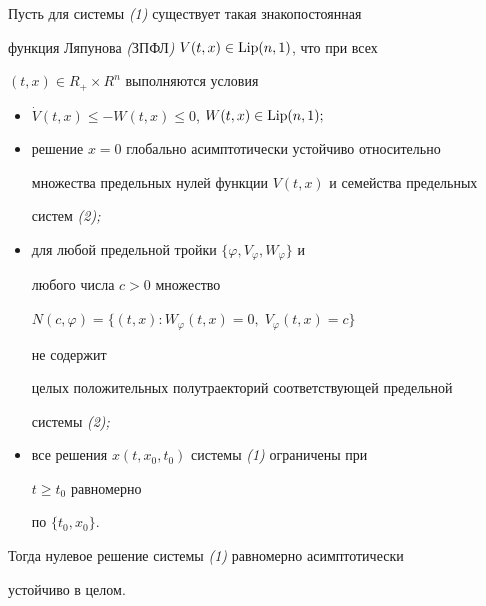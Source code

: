 \begin{thm} Пусть для системы {\em (1)} существует такая знакопостоянная 


функция Ляпунова {\em (}ЗПФЛ{\em )} $V(t,x)\in\operatorname{Lip}(n,1)$, что при всех 


$(t,x)\in R_+\times R^n$ выполняются условия 


\begin{itemize} 


\item[1.] $\Dot V(t,x)\le -W(t,x)\le 0$, $W(t,x)\in\operatorname{Lip}(n,1);$ 


 


\item [2.] решение $x=0$ глобально асимптотически устойчиво относительно 


множества предельных нулей функции $V(t,x)$ и семейства предельных 


систем {\em (2);} 


 


\item[3.] для любой предельной тройки $\{\varphi,V_\varphi,W_\varphi\}$ и 


любого числа $c>0$ множество 


$N(c,\varphi)=\{(t,x):W_\varphi(t,x)=0,\;V_\varphi(t,x)=c\}$ 


не содержит 


целых положительных полутраекторий соответствующей предельной 


системы {\em (2);} 


 


\item[4.] все решения $x(t,x_0,t_0)$ системы {\em (1)} ограничены при 


$t\ge t_0$ равномерно 


по $\{t_0,x_0\}$. 


\end{itemize} 


 


\noindent Тогда нулевое решение системы {\em (1)} равномерно асимптотически 


устойчиво в целом. 


\end{thm} 


\medskip


 


